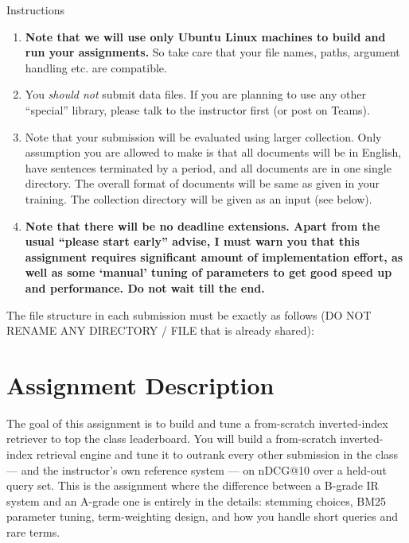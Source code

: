 \documentclass[10pt]{article}
\newcommand{\eat}[1]{}
\begin{document}
\begin{exbox}{Instructions}
{\begin{enumerate}
 \item \textbf{Note that we will use only Ubuntu Linux machines to build and run your assignments.} So take care that your file names, paths, argument handling etc. are compatible.
\item You \emph{should not} submit data files. If you are planning to use any other ``special'' library, please talk to the instructor first (or post on Teams). 
\item Note that your submission will be evaluated using larger collection. Only assumption you are allowed to make is that all documents will be in English, have sentences terminated by a period, \eat{each document is a separate file, }and all documents are in one single directory. The overall format of documents will be same as given in your training. The collection directory will be given as an input (see below).
\item \textbf{Note that there will be no deadline extensions. Apart from the usual ``please start early'' advise, I must warn you that this assignment requires significant amount of implementation effort, as well as some `manual' tuning of parameters to get good speed up and performance. Do not wait till the end.}
\end{enumerate}
}
The file structure in each submission must be exactly as follows (DO NOT RENAME ANY DIRECTORY / FILE that is already shared): 


\end{exbox}

\section{Assignment Description}

The goal of this assignment is to build and tune a from-scratch inverted-index retriever to top the class leaderboard.  You will build a from-scratch inverted-index retrieval engine and tune it to outrank every other submission in the class — and the instructor's own reference system — on nDCG@10 over a held-out query set. This is the assignment where the difference between a B-grade IR system and an A-grade one is entirely in the details: stemming choices, BM25 parameter tuning, term-weighting design, and how you handle short queries and rare terms.
\end{document}

